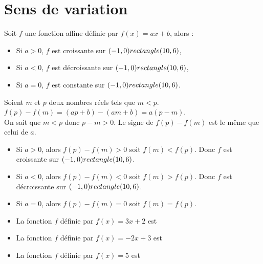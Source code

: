 \section{Sens de variation}

\begin{Propriétés}
Soit $f$ une fonction affine définie par $f(x)=ax+b$, alors :
\begin{itemize}[label=\textcolor{Couleur2}{$\bullet$}]
\item Si $a>0$, $f$ est croissante sur $(-1,0) rectangle (10,6)$,
\item Si $a<0$, $f$ est décroissante sur $(-1,0) rectangle (10,6)$, 
\item Si $a=0$, $f$ est constante sur $(-1,0) rectangle (10,6)$. 
\end{itemize}

\end{Propriétés}

\begin{Remarque}
Soient $m$ et $p$ deux nombres réels tels que $m < p$. $f(p)-f(m) = (ap +b ) - (am + b) = a(p - m)$. \\
On sait que $m < p$ donc $p - m > 0$.
Le signe de $f(p) - f(m)$ est le même que celui de $a$.
\begin{itemize}[label=\textcolor{Couleur7}{$\bullet$}]
\item Si $a>0$, alors $f(p)-f(m)>0$ soit $f(m)<f(p)$.
Donc $f$ est croissante sur $(-1,0) rectangle (10,6)$.
\item Si $a<0$, alors $f(p)-f(m)<0$ soit $f(m)>f(p)$.
Donc $f$ est décroissante sur $(-1,0) rectangle (10,6)$.
\item Si $a=0$, alors $f(p)-f(m)=0$ soit $f(m)=f(p)$.
\end{itemize}
\end{Remarque}

\begin{Exemples}
\leavevmode\vspace{-\baselineskip}
\begin{itemize}[label=\textcolor{Couleur10}{$\bullet$}]
\item La fonction $f$ définie par $f(x)=3x+2$ est \ligne

\item La fonction $f$ définie par $f(x)=-2x+3$ est \ligne

\item La fonction $f$ définie par $f(x)=5$ est \ligne

\end{itemize}
\end{Exemples}

\newpage

